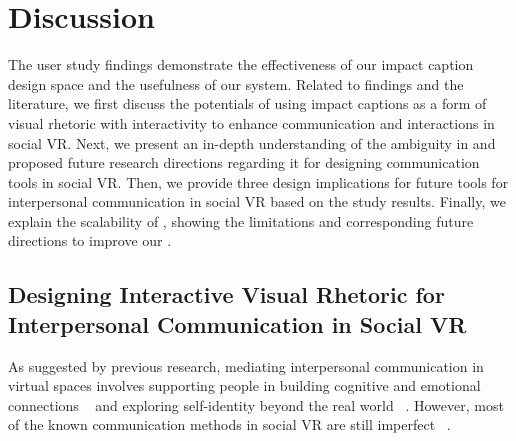 \section{Discussion}
The user study findings demonstrate the effectiveness of our impact caption design space and the usefulness of our \system{} system. 
Related to findings and the literature, we first discuss the potentials of using impact captions as a form of visual rhetoric with interactivity to enhance communication and interactions in social VR.
Next, we present an in-depth understanding of the ambiguity in \system{} and proposed future research directions regarding it for designing communication tools in social VR.
Then, we provide three design implications for future tools for interpersonal communication in social VR based on the study results.
Finally, we explain the scalability of \system{}, showing the limitations and corresponding future directions to improve our \system{}.




\subsection{Designing Interactive Visual Rhetoric for Interpersonal Communication in Social VR}
As suggested by previous research, mediating interpersonal communication in virtual spaces involves supporting people in building cognitive and emotional connections ~\cite{mcveigh2021case, palmer1995interpersonal} and exploring self-identity beyond the real world ~\cite{freeman2021body, sykownik2022something, maloney2020talking}. 
However, most of the known communication methods in social VR are still imperfect ~\cite{wei2022communication, dzardanova2022virtual, akselrad2023body, sykownik2023vr, tanenbaum2020make, baker2021avatar}.

